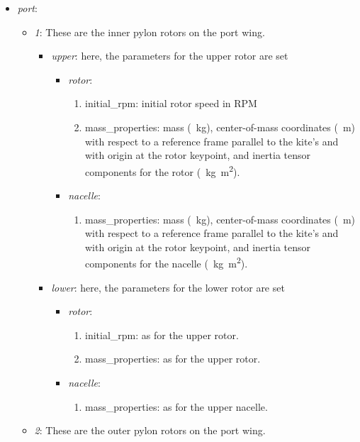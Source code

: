 \documentclass[report]{nrel}
\begin{document}
\begin{itemize}
\item \emph{port}:
\begin{itemize}
	\item \emph{1}:	These are the inner pylon rotors on the port wing.
	\begin{itemize}
		\item \emph{upper}: here, the parameters for the upper rotor are set
		\begin{itemize}
			\item \emph{rotor}:
			\begin{enumerate}
				\item {initial\_rpm}: initial rotor speed in RPM
				\item {mass\_properties}: mass (\SI{}{\kg}), center-of-mass coordinates (\SI{}{\m}) with respect to a reference frame parallel to the kite's and with origin at the rotor keypoint, and inertia tensor components for the rotor (\SI{}{\kg\m\squared}). 
			\end{enumerate}
			\item \emph{nacelle}:
			\begin{enumerate}
				\item {mass\_properties}:  mass (\SI{}{\kg}), center-of-mass coordinates (\SI{}{\m}) with respect to a reference frame parallel to the kite's and with origin at the rotor keypoint, and inertia tensor components for the nacelle (\SI{}{\kg\m\squared}).  
			\end{enumerate}
		\end{itemize}
		\item \emph{lower}: here, the parameters for the lower rotor are set
		\begin{itemize}
			\item \emph{rotor}:
			\begin{enumerate}
				\item {initial\_rpm}: as for the upper rotor.
				\item {mass\_properties}: as for the upper rotor. 
			\end{enumerate}
			\item \emph{nacelle}:
			\begin{enumerate}
				\item {mass\_properties}:  as for the upper nacelle.  
			\end{enumerate}
		\end{itemize}
	\end{itemize}
	\item \emph{2}:	These are the outer pylon rotors  on the port wing.
	\begin{itemize}

\end{itemize}
\end{itemize}
\end{itemize}
\end{document}

